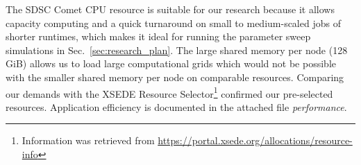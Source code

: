 The SDSC Comet CPU resource is suitable for our research because it allows
capacity computing and a quick turnaround on small to medium-scaled jobs
of shorter runtimes, which makes it ideal for running the parameter sweep simulations in Sec.~\ref{sec:research_plan}. The large shared memory per node (128 GiB) allows us to load 
large computational grids which would not be possible with the smaller shared memory
per node on comparable resources.
Comparing our demands with the XSEDE Resource Selector\footnote{Information was 
retrieved from \url{https://portal.xsede.org/allocations/resource-info}} confirmed our pre-selected resources. Application efficiency is documented in the attached file \textit{performance}.
